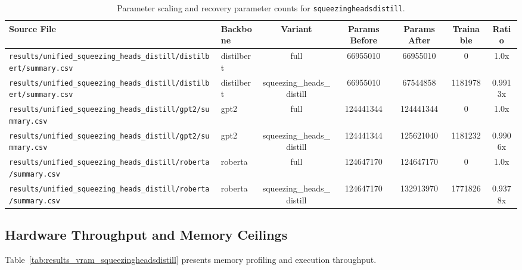\begin{table}[t]
\centering
\small
\begin{tabular}{llccccc}
\toprule
\textbf{Source File} & \textbf{Backbone} & \textbf{Variant} & \textbf{Params Before} & \textbf{Params After} & \textbf{Trainable} & \textbf{Ratio} \\
\midrule
\texttt{results/unified\_squeezing\_heads\_distill/distilbert/summary.csv} & distilbert & full & 66955010 & 66955010 & 0 & 1.0x \\
\texttt{results/unified\_squeezing\_heads\_distill/distilbert/summary.csv} & distilbert & squeezing\_heads\_distill & 66955010 & 67544858 & 1181978 & 0.9913x \\
\texttt{results/unified\_squeezing\_heads\_distill/gpt2/summary.csv} & gpt2 & full & 124441344 & 124441344 & 0 & 1.0x \\
\texttt{results/unified\_squeezing\_heads\_distill/gpt2/summary.csv} & gpt2 & squeezing\_heads\_distill & 124441344 & 125621040 & 1181232 & 0.9906x \\
\texttt{results/unified\_squeezing\_heads\_distill/roberta/summary.csv} & roberta & full & 124647170 & 124647170 & 0 & 1.0x \\
\texttt{results/unified\_squeezing\_heads\_distill/roberta/summary.csv} & roberta & squeezing\_heads\_distill & 124647170 & 132913970 & 1771826 & 0.9378x \\
\bottomrule
\end{tabular}
\caption{Parameter scaling and recovery parameter counts for \texttt{squeezingheadsdistill}.}
\label{tab:results_params_squeezingheadsdistill}
\end{table}

\subsection{Hardware Throughput and Memory Ceilings}
Table~\ref{tab:results_vram_squeezingheadsdistill} presents memory profiling and execution throughput.

